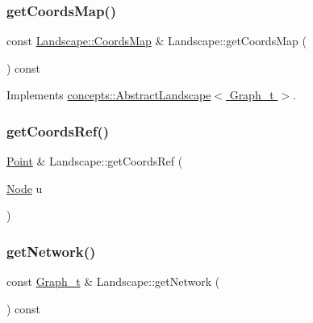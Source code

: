 \mbox{\label{class_landscape_ab6e4efb27be3f1870ce42656a5534d68}} 
\subsubsection{\texorpdfstring{get\+Coords\+Map()}{getCoordsMap()}}
{\footnotesize\ttfamily const \hyperlink{classconcepts_1_1_abstract_landscape_a8432d7dff7edc5a5cbc524592b411f8a}{Landscape\+::\+Coords\+Map} \& Landscape\+::get\+Coords\+Map (\begin{DoxyParamCaption}{ }\end{DoxyParamCaption}) const\hspace{0.3cm}{\ttfamily [virtual]}}



Implements \hyperlink{classconcepts_1_1_abstract_landscape_a5005b0254f3c5aa0ed8505386fca92b3}{concepts\+::\+Abstract\+Landscape$<$ Graph\+\_\+t $>$}.

\mbox{\label{class_landscape_a5c7fb81e36d91b0300815962e1677d5e}} 
\subsubsection{\texorpdfstring{get\+Coords\+Ref()}{getCoordsRef()}}
{\footnotesize\ttfamily \hyperlink{abstract__landscape_8hpp_a9c14bcba65b035519a9c98f1eb1babbe}{Point} \& Landscape\+::get\+Coords\+Ref (\begin{DoxyParamCaption}\item[{\hyperlink{classconcepts_1_1_abstract_landscape_a7c2f90fb9f42302f1af84a59f4df4b91}{Node}}]{u }\end{DoxyParamCaption})}

\mbox{\label{class_landscape_a5f372f74530914d9128a036bbdaf7800}} 
\subsubsection{\texorpdfstring{get\+Network()}{getNetwork()}}
{\footnotesize\ttfamily const \hyperlink{pl__reff_8cpp_a65aea14f39d53b24df9910d54216d620}{Graph\+\_\+t} \& Landscape\+::get\+Network (\begin{DoxyParamCaption}{ }\end{DoxyParamCaption}) const\hspace{0.3cm}{\ttfamily [virtual]}}



